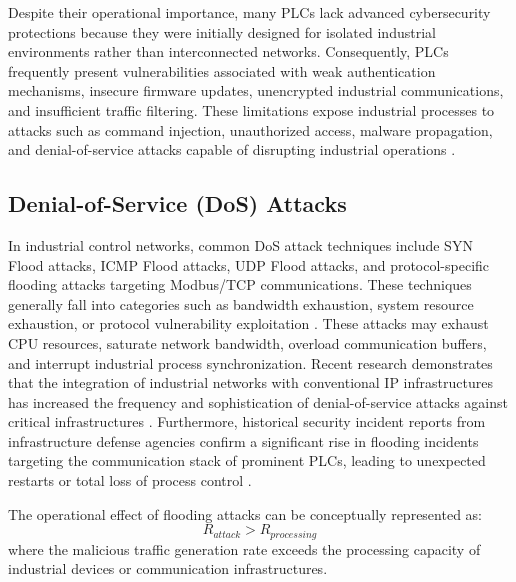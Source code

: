 Despite their operational importance, many PLCs lack advanced cybersecurity protections because they were initially designed for isolated industrial environments rather than interconnected networks. Consequently, PLCs frequently present vulnerabilities associated with weak authentication mechanisms, insecure firmware updates, unencrypted industrial communications, and insufficient traffic filtering. These limitations expose industrial processes to attacks such as command injection, unauthorized access, malware propagation, and denial-of-service attacks capable of disrupting industrial operations \cite{Nicholson2021ICSAttacks}.

\subsection{Denial-of-Service (DoS) Attacks}
In industrial control networks, common DoS attack techniques include SYN Flood attacks, ICMP Flood attacks, UDP Flood attacks, and protocol-specific flooding attacks targeting Modbus/TCP communications. These techniques generally fall into categories such as bandwidth exhaustion, system resource exhaustion, or protocol vulnerability exploitation \cite{Specht2004DDoS}. These attacks may exhaust CPU resources, saturate network bandwidth, overload communication buffers, and interrupt industrial process synchronization. Recent research demonstrates that the integration of industrial networks with conventional IP infrastructures has increased the frequency and sophistication of denial-of-service attacks against critical infrastructures \cite{Nicholson2021ICSAttacks}. Furthermore, historical security incident reports from infrastructure defense agencies confirm a significant rise in flooding incidents targeting the communication stack of prominent PLCs, leading to unexpected restarts or total loss of process control \cite{Chabrow2016ICS}.

The operational effect of flooding attacks can be conceptually represented as:
\[
R_{attack} > R_{processing}
\]
where the malicious traffic generation rate exceeds the processing capacity of industrial devices or communication infrastructures.

